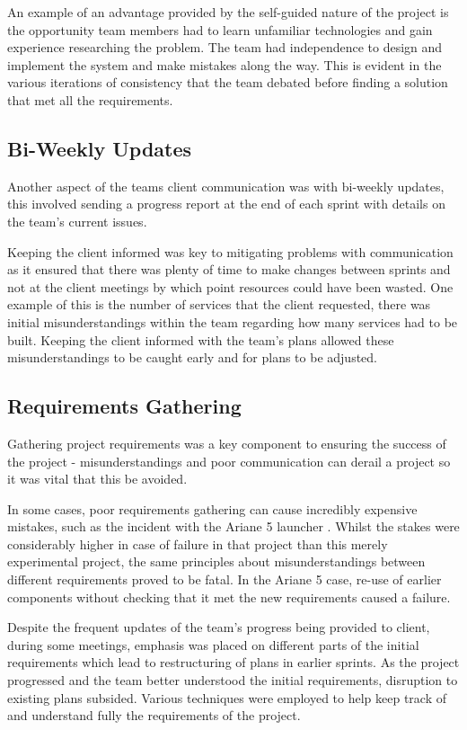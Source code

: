\documentclass{l3proj}
\begin{document}
An example of an advantage provided by the self-guided nature of the project is the opportunity team members had to learn unfamiliar technologies and gain experience researching the problem. The team had independence to design and implement the system and make mistakes along the way. This is evident in the various iterations of consistency that the team debated before finding a solution that met all the requirements.

\subsection{Bi-Weekly Updates}
Another aspect of the teams client communication was with bi-weekly updates, this involved sending a progress report at the end of each sprint with details on the team's current issues.

Keeping the client informed was key to mitigating problems with communication as it ensured that there was plenty of time to make changes between sprints and not at the client meetings by which point resources could have been wasted. One example of this is the number of services that the client requested, there was initial misunderstandings within the team regarding how many services had to be built. Keeping the client informed with the team's plans allowed these misunderstandings to be caught early and for plans to be adjusted.

\subsection{Requirements Gathering}
Gathering project requirements was a key component to ensuring the success of the project - misunderstandings and poor communication can derail a project so it was vital that this be avoided.

In some cases, poor requirements gathering can cause incredibly expensive mistakes, such as the incident with the Ariane 5 launcher \cite{ariane-5}. Whilst the stakes were considerably higher in case of failure in that project than this merely experimental project, the same principles about misunderstandings between different requirements proved to be fatal. In the Ariane 5 case, re-use of earlier components without checking that it met the new requirements caused a failure.

Despite the frequent updates of the team's progress being provided to client, during some meetings, emphasis was placed on different parts of the initial requirements which lead to restructuring of plans in earlier sprints. As the project progressed and the team better understood the initial requirements, disruption to existing plans subsided. Various techniques were employed to help keep track of and understand fully the requirements of the project.
\end{document}

